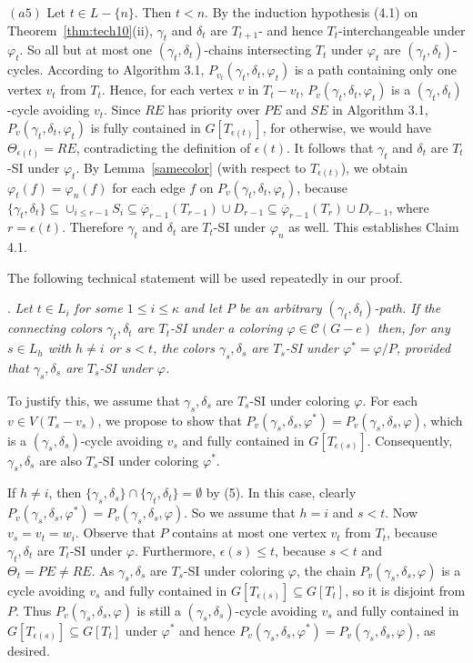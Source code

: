 \documentclass[11pt]{article}
\newcommand{\CC}{\mathcal{C}}
\newcommand{\phibar}{\overline{\varphi}}
\newcommand{\phiv}{\varphi}
\begin{document}
$(a5)$ Let $t\in L-\{n\}$. Then $t<n$. By the induction hypothesis (4.1) on Theorem~\ref{thm:tech10}(ii), $\gamma_t$ and $\delta_t$ are $T_{t+1}$- and hence
$T_t$-interchangeable under $\phiv_t$. So all but at most one $(\gamma_t, \delta_t)$-chains intersecting $T_t$ under $\phiv_t$ are $(\gamma_t, \delta_t)$-cycles.
According to Algorithm 3.1,  $P_{v_t}(\gamma_t, \delta_t, \phiv_t)$ is a path containing only one vertex $v_t$ from $T_t$.
Hence, for each vertex $v$ in $T_t-v_t$, $P_v(\gamma_t, \delta_t, \phiv_t)$ is a $(\gamma_t, \delta_t)$-cycle avoiding $v_t$. Since  $RE$ has 
priority over $PE$ and $SE$ in Algorithm 3.1, $P_v(\gamma_t, \delta_t, \phiv_t)$ is fully contained in 
$G[T_{\epsilon(t)}]$, for otherwise, we would have $\Theta_{\epsilon(t)}=RE$, contradicting the definition of $\epsilon(t)$.
It follows that $\gamma_t$ and $\delta_t$ are $T_t$-SI under $\phiv_t$. By Lemma~\ref{samecolor} (with respect to $T_{\epsilon(t)}$),  
we obtain $\phiv_t (f) = \phiv_n(f)$ for each edge $f$ on $P_{v}(\gamma_t, \delta_t, \phiv_t)$, because $\{\gamma_t, \delta_t\}
\subseteq \cup_{i\le r-1} S_i \subseteq \phibar_{r-1}(T_{r-1}) \cup D_{r-1} \subseteq \phibar_{r-1}(T_r) \cup D_{r-1}$, where 
$r=\epsilon(t)$. Therefore $\gamma_t$ and $\delta_t$ are $T_t$-SI under $\phiv_n$ as well. This establishes Claim 4.1. 

\vskip 2mm
The following technical statement will be used repeatedly in our proof. 

\vskip 2mm
. {\em Let $t\in L_i$ for some $1\le i \le \kappa$ and let $P$ be an arbitrary $(\gamma_t, \delta_t)$-path. If 
the connecting colors $\gamma_t, \delta_t$ are $T_t$-SI under a coloring $\phiv\in \CC(G-e)$ then, for any $s\in L_h$ with  $h \ne i$ 
or $s<  t$, the colors $\gamma_s, \delta_s$ are $T_s$-SI under $\phiv^* = \phiv/P$, provided that $\gamma_s, \delta_s$ are $T_s$-SI 
under $\phiv$. }

\vskip 2mm
To justify this, we assume that $\gamma_s, \delta_s$ are $T_s$-SI under coloring $\phiv$. For each $v\in V(T_s-v_s)$, we propose to show that 
$P_v(\gamma_s, \delta_s, \phiv^*)=P_v(\gamma_s, \delta_s, \phiv)$, which is a $(\gamma_s, \delta_s)$-cycle 
avoiding $v_s$ and fully contained in $G[T_{\epsilon(s)}]$. Consequently, $\gamma_s, \delta_s$ are also $T_s$-SI under coloring $\phiv^*$.  

If $h\ne i$, then $\{\gamma_s, \delta_ s\} \cap \{\gamma_t, \delta_t\} = \emptyset$ by (5). In this case, clearly $P_v(\gamma_s, \delta_s, \phiv^*) = P_v(\gamma_s, \delta_s, \phiv)$. 
So we assume that $h =i$ and $s< t$. Now $v_s=v_t=w_i$.  Observe that $P$ contains at most one vertex $v_t$ from $T_t$, because $\gamma_t, \delta_t$ 
are $T_t$-SI under $\phiv$. Furthermore, $\epsilon(s) \le t$, because $s <t$ and $\Theta_t =PE \ne RE$.  As $\gamma_s, \delta_s$ are $T_s$-SI under coloring $\phiv$, 
the chain $P_v(\gamma_s, \delta_s, \phiv)$ is a cycle avoiding $v_s$ and fully contained in $G[T_{\epsilon(s)}] \subseteq G[T_t]$, so it is disjoint 
from $P$. Thus $P_v(\gamma_s, \delta_s, \phiv)$ is still a $(\gamma_s, \delta_s)$-cycle avoiding $v_s$ and fully contained in $G[T_{\epsilon(s)}] 
\subseteq G[T_t]$ under $\phiv^*$ and hence $P_v(\gamma_s, \delta_s, \phiv^*) = P_v(\gamma_s, \delta_s, \phiv)$, as desired.  
\end{document}
